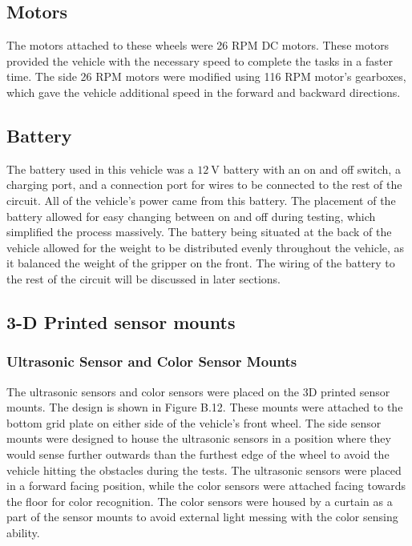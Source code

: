 \documentclass[11pt]{report}
\begin{document}
\subsection{Motors}
The motors attached to these wheels were 26 \gls{RPM} \gls{DC} motors. These motors provided the vehicle with the necessary speed to complete the tasks in a faster time. The side 26 \gls{RPM} motors were modified using 116 \gls{RPM} motor’s gearboxes, which gave the vehicle additional speed in the forward and backward directions. 

\subsection{Battery}
The battery used in this vehicle was a $\SI{12}{\volt}$ battery with an on and off switch, a charging port, and a connection port for wires to be connected to the rest of the circuit. All of the vehicle’s power came from this battery. The placement of the battery allowed for easy changing between on and off during testing, which simplified the process massively. The battery being situated at the back of the vehicle allowed for the weight to be distributed evenly throughout the vehicle, as it balanced the weight of the gripper on the front. The wiring of the battery to the rest of the circuit will be discussed in later sections. 

\subsection{3-D Printed sensor mounts}
\subsubsection{Ultrasonic Sensor and Color Sensor Mounts}
The ultrasonic sensors and color sensors were placed on the 3D printed sensor mounts. The design is shown in Figure B.12. These mounts were attached to the bottom grid plate on either side of the vehicle’s front wheel. The side sensor mounts were designed to house the ultrasonic sensors in a position where they would sense further outwards than the furthest edge of the wheel to avoid the vehicle hitting the obstacles during the tests. The ultrasonic sensors were placed in a forward facing position, while the color sensors were attached facing towards the floor for color recognition. The color sensors were housed by a curtain as a part of the sensor mounts to avoid external light messing with the color sensing ability.
\end{document}
